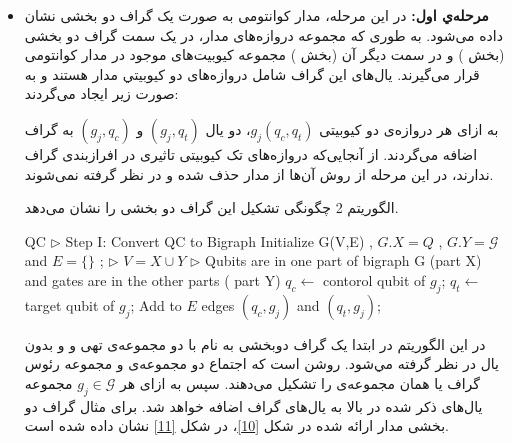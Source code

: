 \begin{itemize}
\item
\textbf{مرحله‌ي اول:}
در این مرحله، مدار کوانتومی به صورت یک گراف دو بخشی نشان داده می‌شود. به طوری که مجموعه دروازه‌های مدار، در یک سمت گراف دو بخشی (بخش ) و در سمت دیگر آن (بخش ) مجموعه کیوبیت‌های موجود در مدار کوانتومی قرار می‌گیرند. یال‌های اين گراف شامل دروازه‌های دو کیوبیتي مدار هستند و به صورت زیر ایجاد می‌گردند:

به ازای هر دروازه‌ی دو کیوبیتی $g_{j}(q_{c},q_{t})$، دو یال $(g_{j},q_{t})$ و $(g_{j},q_{c})$ به گراف اضافه می‌گردند. از آنجایی‌که دروازه‌های تک کیوبیتی تاثیری در افرازبندی گراف ندارند، در این مرحله از روش آن‌ها از مدار حذف شده و در نظر گرفته نمی‌شوند. 

الگوریتم 2 چگونگی تشکیل این گراف دو بخشی را نشان می‌دهد.

 \begin{algorithm}
{
\fontsize{9}{1}
\caption{$\text{: چگونگی تبدیل مدار کوانتومی به گراف دو بخشی}$}
\begin{algorithmic}[2]
\begin{latin}
 {QC}
\State\textcolor[rgb]{0.00,0.50,1.00}{ $\triangleright$   Step I: Convert QC to Bigraph}
\State Initialize G(V,E) ,   $G.X=Q$  ,  $G.Y=\mathcal{G}$ and   $ E=\{\}$ ; \textcolor[rgb]{0.00,0.50,1.00}{ $\triangleright$ $ V=X \cup Y$}
\State\textcolor[rgb]{0.00,0.50,1.00}{ $\triangleright$  Qubits are in one part of bigraph G (part X) and gates are in the other parts ( part Y)  }
         \State $q_c\leftarrow$ contorol qubit of $g_{j}$;
        \State $q_t \leftarrow$ target qubit of $g_{j}$;
         \State  Add to $E$ edges $(q_c,g_{j})$ and $(q_t,g_{j})$;
 \EndFor
\EndFunction
\end{latin}
\end{algorithmic}
}
\end{algorithm}

در این الگوریتم در ابتدا یک گراف دوبخشی به نام  با دو مجموعه‌ی تهی  و  و بدون یال در نظر گرفته مي‌شود. روشن است که اجتماع دو مجموعه‌ی  و  مجموعه رئوس گراف یا همان مجموعه‌ی  را تشکیل می‌دهند. سپس به ازای هر $g_j \in \mathcal{G}$ مجموعه یال‌های ذکر شده در بالا به یال‌های گراف اضافه خواهد شد. برای مثال گراف دو بخشی  مدار ارائه شده در شکل \ref{10}، در شکل \ref{11} نشان داده شده است.
\begin{figure}
\begin{center}

\end{center}
\end{figure}
\end{itemize}
